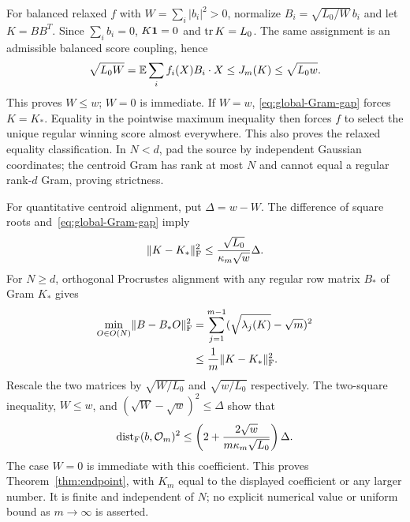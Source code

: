 For balanced relaxed $f$ with $W=\sum_i|b_i|^2>0$, normalize
$B_i=\sqrt{L_0/W}\,b_i$ and let $K=BB^T$. Since $\sum_i b_i=0$,
$K\mathbf 1=0$ and $\operatorname{tr} K=L_0$. The same assignment is an admissible balanced
score coupling, hence
\[
 \sqrt{L_0W}=\mathbb E\sum_i f_i(X)B_i\cdot X
 \leq J_m(K)\leq\sqrt{L_0w}.
\]
This proves $W\leq w$; $W=0$ is immediate.
If $W=w$, \eqref{eq:global-Gram-gap} forces $K=K_*$. Equality in the
pointwise maximum inequality then forces $f$ to select the unique regular
winning score almost everywhere. This also proves the relaxed equality
classification. In $N<d$, pad the source by independent Gaussian coordinates;
the centroid Gram has rank at most $N$ and cannot equal a regular rank-$d$
Gram, proving strictness.

For quantitative centroid alignment, put $\Delta=w-W$. The difference of
square roots and~\eqref{eq:global-Gram-gap} imply
\[
 \lVert K-K_*\rVert_{\mathrm F}^2
 \leq\frac{\sqrt{L_0}}{\kappa_m\sqrt w}\Delta.
\]
For $N\geq d$, orthogonal Procrustes alignment with any regular row matrix
$B_*$ of Gram $K_*$ gives
\begin{align*}
 \min_{O\in O(N)}\lVert B-B_*O\rVert_{\mathrm F}^2
 &=\sum_{j=1}^{m-1}(\sqrt{\lambda_j(K)}-\sqrt m)^2\\
 &\leq \frac1m\lVert K-K_*\rVert_{\mathrm F}^2.
\end{align*}
Rescale the two matrices by $\sqrt{W/L_0}$ and $\sqrt{w/L_0}$ respectively.
The two-square inequality, $W\leq w$, and
$(\sqrt W-\sqrt w)^2\leq\Delta$ show that
\begin{equation}\label{eq:K-explicit}
 \operatorname{dist}_{\mathrm F}(b,\mathcal O_m)^2
 \leq\left(2+\frac{2\sqrt w}{m\kappa_m\sqrt{L_0}}\right)\Delta.
\end{equation}
The case $W=0$ is immediate with this coefficient. This proves
Theorem~\ref{thm:endpoint}, with $K_m$ equal to the displayed coefficient or
any larger number. It is finite and independent of $N$; no explicit
numerical value or uniform bound as $m\to\infty$ is asserted.

